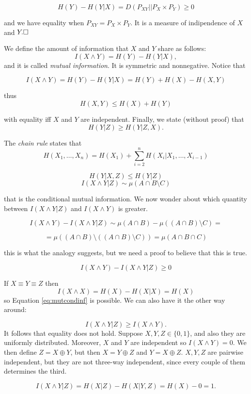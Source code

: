 \[
 H(Y) - H(Y|X) = D(P_{XY}||P_X \times P_Y) \geq 0
\]

and we have equality when $P_{XY} = P_X \times P_Y$. It is a measure of indipendence of $X$ and $Y. \hfill\Box$

We define the amount of information that $X$ and $Y$ share as follows:
$$I(X \wedge Y) = H(Y) - H(Y|X),$$
and it is called \emph{mutual information}. It is symmetric and nonnegative. Notice that

\[
 I(X \wedge Y) = H(Y) - H(Y|X) = H(Y) + H(X) - H(X, Y)
\]

thus
\[
 H(X, Y) \leq H(X) + H(Y)
\]

with equality iff $X$ and $Y$ are independent. Finally, we state (without proof) that
\[
 H(Y|Z) \geq H(Y |Z, X).
\]

The \emph{chain rule} states that
\[
 H(X_1, \ldots, X_n) = H(X_1) + \sum_{i = 2}^n H(X_i | X_1, \ldots, X_{i-1})
\]


\[
 H(Y | X, Z) \leq H(Y|Z)
\]
\[
 I(X\wedge Y | Z) \sim \mu(A \cap B \setminus C)
\]

that is the conditional mutual information. We now wonder about which quantity between $I(X \wedge Y | Z)$ and $I(X \wedge Y)$ is greater.

\[
 I(X \wedge Y) -  I(X\wedge Y | Z)  \sim \mu(A \cap B) - \mu((A \cap B) \setminus C) = 
\]

\[
 = \mu((A \cap B) \setminus ((A \cap B) \setminus C)) = \mu(A \cap B \cap C)
\]

this is what the analogy suggests, but we need a proof to believe that this is true.

\begin{equation}\label{eq:mutcondinf}
 I(X \wedge Y) - I(X \wedge Y | Z) \geq 0
\end{equation}

If $X \equiv Y \equiv Z$ then $$I(X \wedge X) = H(X) - H(X|X) = H(X)$$ so Equation \ref{eq:mutcondinf} is possible. We can also have it the other way around:

$$I(X \wedge Y | Z) \geq I(X \wedge Y).$$ It follows that equality does not hold. Suppose $X, Y, Z \in \{0, 1\}$, and also they are uniformly distributed. Moreover, $X$ and $Y$ are independent so $I(X \wedge Y) = 0$. We then define $Z = X \oplus Y$, but then $X = Y \oplus Z$ and $Y = X \oplus Z$. $X, Y, Z$ are pairwise independent, but they are not three-way independent, since every couple of them determines the third.

\[
 I(X\wedge Y|Z) = H(X|Z) - H(X|Y, Z) = H(X) - 0 = 1.
\]

